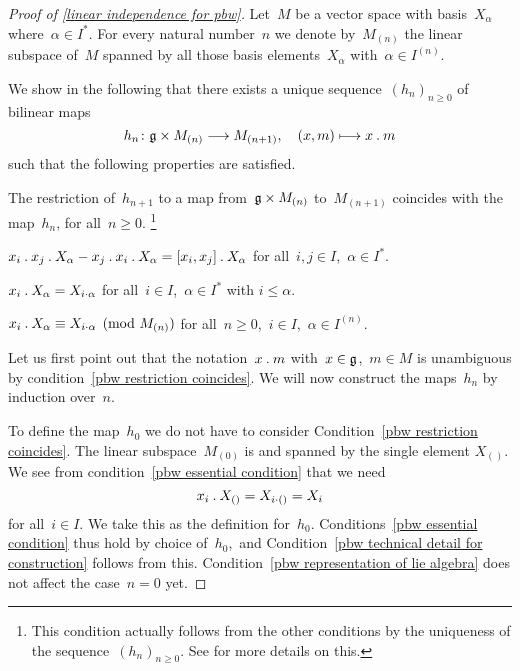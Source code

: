 \begin{proof}[Proof of \cref{linear independence for pbw}]
  Let~$M$ be a vector space with basis~$X_\alpha$ where~$\alpha \in I^*$.
  For every natural number~$n$ we denote by~$M_{(n)}$ the linear subspace of~$M$ spanned by all those basis elements~$X_\alpha$ with~$\alpha \in I^{(n)}$.

  We show in the following that there exists a unique sequence~$(h_n)_{n \geq 0}$ of bilinear maps
  \[
    h_n
    \colon
    \glie \times M_{(n)}
    \to
    M_{(n+1)},
    \quad
    (x, m)
    \mapsto
    x \act m
  \]
  such that the following properties are satisfied.
  \begin{enumerate*}
    \item
      \label{pbw restriction coincides}
      The restriction of~$h_{n+1}$ to a map from~$\mathfrak{g} \times M_{(n)}$ to~$M_{(n+1)}$ coincides with the map~$h_n$, for all~$n \geq 0$.%
      \footnote{
        This condition actually follows from the other conditions by the uniqueness of the sequence~$(h_n)_{n \geq 0}$.
        See \cite[\S 17.4]{humphreys} for more details on this.
      }
    \item
      \label{pbw representation of lie algebra}
      $x_i \mathbin{.} x_j \mathbin{.} X_\alpha - x_j \mathbin{.} x_i \mathbin{.} X_\alpha = [x_i, x_j] \mathbin{.} X_\alpha$ for all~$i,j \in I$,~$\alpha \in I^*$.
    \item
      \label{pbw essential condition}
      $x_i \mathbin{.} X_\alpha = X_{i \cdot \alpha}$ for all~$i \in I$,~$\alpha \in I^*$ with $i \leq \alpha$.
    \item
      \label{pbw technical detail for construction}
      $x_i \mathbin{.} X_\alpha \equiv X_{i \cdot \alpha} \pmod{M_{(n)}}$ for all~$n \geq 0$,~$i \in I$,~$\alpha \in I^{(n)}$.
  \end{enumerate*}

  Let us first point out that the notation~$x \mathbin{.} m$ with~$x \in \mathfrak{g}$,~$m \in M$ is unambiguous by condition~\ref{pbw restriction coincides}.
  We will now construct the maps~$h_n$ by induction over~$n$.
  
  To define the map~$h_0$ we do not have to consider Condition~\ref*{pbw restriction coincides}.
  The linear subspace~$M_{(0)}$ is {\onedimensional} and spanned by the single element $X_{()}$.
  We see from condition~\ref*{pbw essential condition} that we need
  \[
    x_i \mathbin{.} X_{()}
    =
    X_{i \cdot ()}
    =
    X_i
  \]
  for all~$i \in I$.
  We take this as the definition for~$h_0$.
  Conditions~\ref{pbw essential condition} thus hold by choice of~$h_0$,~and Condition~\ref{pbw technical detail for construction} follows from this.
  Condition~\ref{pbw representation of lie algebra} does not affect the case~$n = 0$ yet.


\end{proof}
